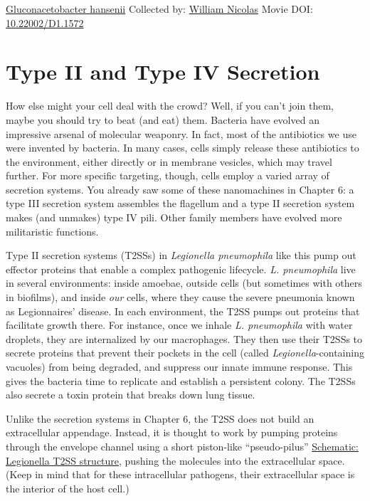 \documentclass[]{tufte-book}
\begin{document}
\hypertarget{htmlwidget-cdfabf11c31bbd7022ab}{}

\label{fig:9-2}\protect\hyperlink{tree}{Gluconacetobacter hansenii} Collected by: \protect\hyperlink{william_nicolas}{William Nicolas} Movie DOI: \href{https://doi.org/10.22002/D1.1572}{10.22002/D1.1572}

\hypertarget{type-ii-and-type-iv-secretion}{%
\section{Type II and Type IV Secretion}\label{type-ii-and-type-iv-secretion}}

How else might your cell deal with the crowd? Well, if you can't join them, maybe you should try to beat (and eat) them. Bacteria have evolved an impressive arsenal of molecular weaponry. In fact, most of the antibiotics we use were invented by bacteria. In many cases, cells simply release these antibiotics to the environment, either directly or in membrane vesicles, which may travel further. For more specific targeting, though, cells employ a varied array of secretion systems. You already saw some of these nanomachines in Chapter 6: a type III secretion system assembles the flagellum and a type II secretion system makes (and unmakes) type IV pili. Other family members have evolved more militaristic functions.

Type II secretion systems (T2SSs) in \emph{Legionella pneumophila} like this pump out effector proteins that enable a complex pathogenic lifecycle. \emph{L. pneumophila} live in several environments: inside amoebae, outside cells (but sometimes with others in biofilms), and inside \emph{our} cells, where they cause the severe pneumonia known as Legionnaires' disease. In each environment, the T2SS pumps out proteins that facilitate growth there. For instance, once we inhale \emph{L. pneumophila} with water droplets, they are internalized by our macrophages. They then use their T2SSs to secrete proteins that prevent their pockets in the cell (called \emph{Legionella}-containing vacuoles) from being degraded, and suppress our innate immune response. This gives the bacteria time to replicate and establish a persistent colony. The T2SSs also secrete a toxin protein that breaks down lung tissue.

Unlike the secretion systems in Chapter 6, the T2SS does not build an extracellular appendage. Instead, it is thought to work by pumping proteins through the envelope channel using a short piston-like ``pseudo-pilus'' \protect\hyperlink{Legionella_T2SS_structure}{Schematic: Legionella T2SS structure}, pushing the molecules into the extracellular space. (Keep in mind that for these intracellular pathogens, their extracellular space is the interior of the host cell.)
\end{document}
